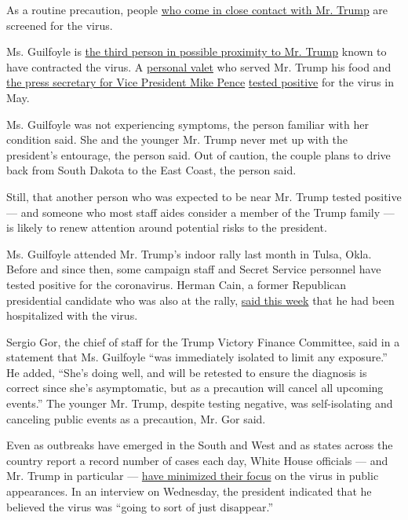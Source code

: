 As a routine precaution, people
\href{https://www.nytimes.com/2020/05/01/us/politics/coronavirus-testing-senate-white-house.html}{who
come in close contact with Mr. Trump} are screened for the virus.

Ms. Guilfoyle is
\href{https://www.nytimes.com/2020/05/10/us/politics/white-house-coronavirus-trump.html}{the
third person in possible proximity to Mr. Trump} known to have
contracted the virus. A
\href{https://www.nytimes.com/2020/05/07/us/politics/coronavirus-white-house-military-aide.html}{personal
valet} who served Mr. Trump his food and
\href{https://www.nytimes.com/2020/05/08/us/politics/white-house-coronavirus-safety.html}{the
press secretary for Vice President Mike Pence}
\href{https://www.nytimes.com/2020/05/08/us/politics/white-house-coronavirus-safety.html}{tested
positive} for the virus in May.

Ms. Guilfoyle was not experiencing symptoms, the person familiar with
her condition said. She and the younger Mr. Trump never met up with the
president's entourage, the person said. Out of caution, the couple plans
to drive back from South Dakota to the East Coast, the person said.

Still, that another person who was expected to be near Mr. Trump tested
positive --- and someone who most staff aides consider a member of the
Trump family --- is likely to renew attention around potential risks to
the president.

Ms. Guilfoyle attended Mr. Trump's indoor rally last month in Tulsa,
Okla. Before and since then, some campaign staff and Secret Service
personnel have tested positive for the coronavirus. Herman Cain, a
former Republican presidential candidate who was also at the rally,
\href{https://www.nytimes.com/2020/07/02/us/politics/herman-cain-coronavirus.html}{said
this week} that he had been hospitalized with the virus.

Sergio Gor, the chief of staff for the Trump Victory Finance Committee,
said in a statement that Ms. Guilfoyle ``was immediately isolated to
limit any exposure.'' He added, ``She's doing well, and will be retested
to ensure the diagnosis is correct since she's asymptomatic, but as a
precaution will cancel all upcoming events.'' The younger Mr. Trump,
despite testing negative, was self-isolating and canceling public events
as a precaution, Mr. Gor said.

Even as outbreaks have emerged in the South and West and as states
across the country report a record number of cases each day, White House
officials --- and Mr. Trump in particular ---
\href{https://www.nytimes.com/2020/06/26/us/politics/trump-coronavirus.html}{have
minimized their focus} on the virus in public appearances. In an
interview on Wednesday, the president indicated that he believed the
virus was ``going to sort of just disappear.''

